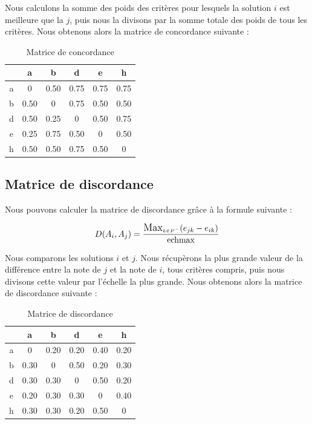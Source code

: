 \documentclass[paper=a4, fontsize=11pt]{report}
\numberwithin{equation}{section}		%
\numberwithin{figure}{section}			%
\numberwithin{table}{section}				%
\begin{document}
Nous calculons la somme des poids des critères pour lesquels la solution $i$ est meilleure que la $j$, puis nous la divisons par la somme totale des poids de tous les critères. Nous obtenons alors la matrice de concordance suivante : \\

\begin{table}[H]
\begin{center}
\begin{tabular}{c|ccccc}
 & a & b & d & e & h \\ 
\hline 
a & 0 & 0.50 & 0.75 & 0.75 & 0.75 \\ 
b & 0.50 & 0 &	0.75 &	 0.50 & 0.50 \\ 
d & 0.50 & 0.25 & 0 & 0.50 & 0.75 \\ 
e & 0.25 & 0.75 & 0.50 & 0 & 0.50 \\ 
h & 0.50 & 0.50 & 0.75 & 0.50 & 0\\ 
\end{tabular} 
\caption{Matrice de concordance} 
\end{center}
\end{table}

\subsection{Matrice de discordance} 

Nous pouvons calculer la matrice de discordance grâce à la formule suivante :

\begin{equation*}
D(A_i, A_j) = \frac{\mathlarger{\mathlarger{\text{Max}}}_{\mathsmaller{k \in P^- }} (e_{jk} - e_{ik})}{\text{echmax}}
\end{equation*} 

Nous comparons les solutions $i$ et $j$. Nous récupèrons la plus grande valeur de la différence entre la note de $j$ et la note de $i$, tous critères compris, puis nous divisons cette valeur par l’échelle la plus grande. Nous obtenons alors la matrice de discordance suivante : \\

\begin{table}[H]
\begin{center}
\begin{tabular}{c|ccccc}
 & a & b & d & e & h \\ 
\hline 
a & 0 & 0.20	 & 0.20 & 0.40 & 0.20 \\ 
b & 0.30 & 0	& 0.50 & 0.20 &	0.30 \\ 
d & 0.30 & 0.30 & 0 & 0.50 &	0.20 \\ 
e & 0.20 & 0.30 & 0.30 & 0 & 0.40 \\ 
h & 0.30 & 0.30 & 0.20 &	0.50 & 0\\ 
\end{tabular} 
\caption{Matrice de discordance} 
\end{center}
\end{table}
\end{document}
